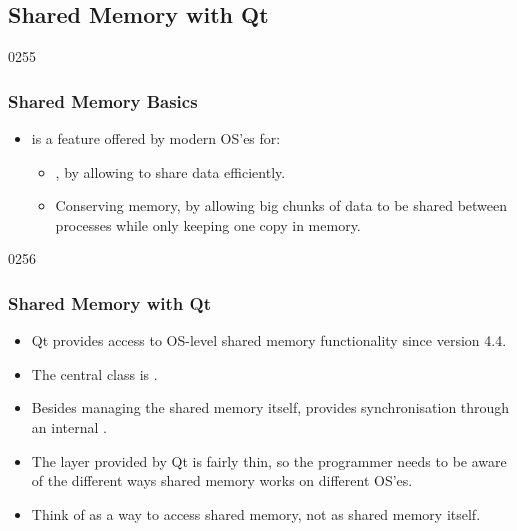 \subsection{Shared Memory with Qt}\label{sharedMemory}

\begin{slide}{0255}
\frametitle{Shared Memory Basics} \label{sharedmemory}
\begin{itemize}
  \item {} is a feature offered by modern OS'es for:
  \begin{itemize}
  \item {}, by allowing  to share data efficiently.
  \item Conserving memory, by allowing big chunks of data to be shared between processes while only keeping one copy in memory.
  \end{itemize}
  \end{itemize}
\end{slide}

\begin{slide}{0256}
\frametitle{Shared Memory with Qt}
\begin{itemize}
  \item Qt provides access to OS-level shared memory functionality since version 4.4.
  \item The central class is .
  \item Besides managing the shared memory itself,  provides synchronisation through an internal .
  \item The layer provided by Qt is fairly thin, so the programmer needs to be aware of the different ways shared memory works on different OS'es.
  \item Think of  as a way to access shared memory, not as shared memory itself.
  \end{itemize}
\end{slide}

